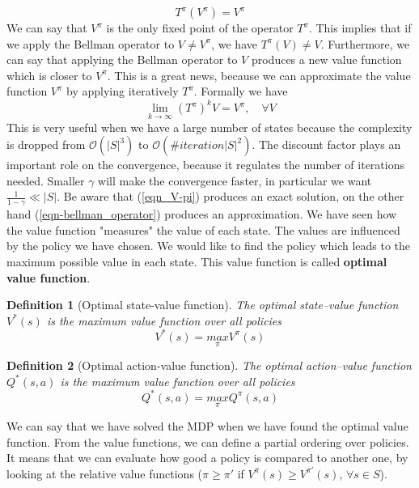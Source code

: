 \documentclass[main.tex]{subfiles}
\newtheorem{definition}{Definition}[section]
\begin{document}
\begin{equation}
T^{\pi}(V^{\pi}) = V^{\pi}
\end{equation}
We can say that $V^{\pi}$ is the only fixed point\footnotemark {} of the operator $T^{\pi}$. This implies that if we apply the Bellman operator to $V \neq V^{\pi}$, we have $T^{\pi}(V) \neq V$. Furthermore, we can say that applying the Bellman operator to $V$ produces a new value function which is closer to $V^{\pi}$. This is a great news, because we can approximate the value function $V^{\pi}$ by applying iteratively $T^{\pi}$. Formally we have
\begin{equation}
    \lim_{k \rightarrow \infty} (T^{\pi})^k V = V^{\pi}, \quad \forall V \label{eqn-bellman_operator}
\end{equation}
This is very useful when we have a large number of states because the complexity is dropped from $\mathcal{O}(|S|^3)$ to $\mathcal{O}(\#iteration|S|^2)$. The discount factor plays an important role on the convergence, because it regulates the number of iterations needed. Smaller $\gamma$ will make the convergence faster, in particular we want $\frac{1}{1-\gamma} \ll |S|$.
Be aware that (\ref{eqn_V-pi}) produces an exact solution, on the other hand (\ref{eqn-bellman_operator}) produces an approximation.
\newline
We have seen how the value function "measures" the value of each state. The values are influenced by the policy we have chosen. We would like to find the policy which leads to the maximum possible value in each state. This value function is called \textbf{optimal value function}.
\begin{definition}[Optimal state-value function]
The optimal state–value function $V^*(s)$ is the maximum value function over all policies
\begin{equation}
    V^*(s) = \underset{\pi}{max} V^{\pi}(s)
\end{equation}
\end{definition}
\begin{definition}[Optimal action-value function]
The optimal action–value function $Q^*(s,a)$ is the maximum value function over all policies
\begin{equation}
    Q^*(s,a) = \underset{\pi}{max} Q^{\pi}(s,a)
\end{equation}
\end{definition}
We can say that we have solved the MDP when we have found the optimal value function. From the value functions, we can define a partial ordering over policies. It means that we can evaluate how good a policy is compared to another one, by looking at the relative value functions ($\pi \geq \pi'$ if $V^{\pi}(s) \geq V^{\pi'}(s)$, $\forall s \in S$).
\end{document}
